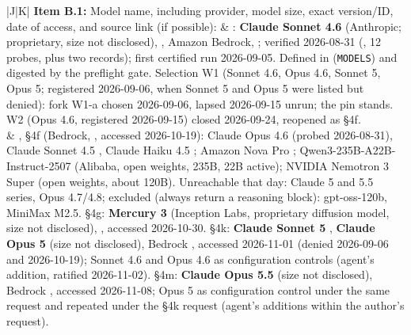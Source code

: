 \documentclass[12pt]{article}
\begin{document}
{\begin{longtable}{|J|K|}
\textbf{Item B.1:} Model name, including provider, model size, exact version/ID, date of access, and source link (if possible):
&
: \textbf{Claude Sonnet 4.6} (Anthropic; proprietary, size not disclosed), , Amazon Bedrock, ; verified 2026-08-31 (, 12 probes, plus two  records); first certified run 2026-09-05. Defined in  (\texttt{MODELS}) and digested by the preflight gate. Selection W1 (Sonnet 4.6, Opus 4.6, Sonnet 5, Opus 5; registered 2026-09-06, when Sonnet 5 and Opus 5 were listed but denied): fork W1-a chosen 2026-09-06, lapsed 2026-09-15 unrun; the pin stands. W2 (Opus 4.6, registered 2026-09-15) closed 2026-09-24, reopened as \S4f.
\\[2pt]
& , \S4f (Bedrock, , accessed 2026-10-19): Claude Opus 4.6  (probed 2026-08-31), Claude Sonnet 4.5 , Claude Haiku 4.5 ; Amazon Nova Pro ; Qwen3-235B-A22B-Instruct-2507  (Alibaba, open weights, 235B, 22B active); NVIDIA Nemotron 3 Super  (open weights, about 120B). Unreachable that day: Claude 5 and 5.5 series, Opus 4.7/4.8; excluded (always return a reasoning block): gpt-oss-120b, MiniMax M2.5. \S4g: \textbf{Mercury 3}  (Inception Labs, proprietary diffusion model, size not disclosed), , accessed 2026-10-30. \S4k: \textbf{Claude Sonnet 5} , \textbf{Claude Opus 5}  (size not disclosed), Bedrock , accessed 2026-11-01 (denied 2026-09-06 and 2026-10-19); Sonnet 4.6 and Opus 4.6 as configuration controls (agent's addition, ratified 2026-11-02). \S4m: \textbf{Claude Opus 5.5}  (size not disclosed), Bedrock , accessed 2026-11-08; Opus 5 as configuration control under the same request and repeated under the \S4k request (agent's additions within the author's request).

\end{longtable}}
\end{document}
